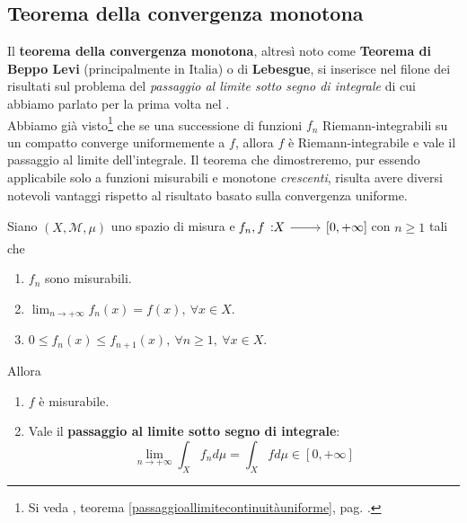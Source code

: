 \subsection{Teorema della convergenza monotona}
Il \textbf{teorema della convergenza monotona}, altresì noto come \textbf{Teorema di Beppo Levi} (principalmente in Italia) o di \textbf{Lebesgue}, si inserisce nel filone dei risultati sul problema del \textit{passaggio al limite sotto segno di integrale} di cui abbiamo parlato per la prima volta nel .\\
Abbiamo già visto\footnote{Si veda , teorema \ref{passaggioallimitecontinuitàuniforme}, pag. \pageref{passaggioallimitecontinuitàuniforme}.} che se una successione di funzioni $f_n$ Riemann-integrabili su un compatto converge uniformemente a $f$, allora $f$ è Riemann-integrabile e vale il passaggio al limite dell'integrale. Il teorema che dimostreremo, pur essendo applicabile solo a funzioni misurabili e monotone \textit{crescenti}, risulta avere diversi notevoli vantaggi rispetto al risultato basato sulla convergenza uniforme.
\begin{theorema}\label{thmconvergenzamonotona}
	Siano $\left(X,\mathcal{M},\mu\right)$ uno spazio di misura e $\funz{f_n,f}{X}{\left[0,+\infty\right]}$ con $n\geq 1$ tali che
	\begin{enumerate}[label=(\alph*)]
		\item $f_n$ sono misurabili.
		\item $\displaystyle\lim_{n\to+\infty}f_n(x)=f(x),\ \forall x\in X$.
		\item $0\leq f_n(x)\leq f_{n+1}(x),\ \forall n\geq 1,\ \forall x\in X$.
	\end{enumerate}
Allora
\begin{enumerate}
	\item $f$ è misurabile.
	\item Vale il \textbf{passaggio al limite sotto segno di integrale}:
	\begin{equation}
		\lim_{n\to+\infty}\int_Xf_nd\mu=\int_Xfd\mu\in\left[0,+\infty\right]
	\end{equation}
\end{enumerate}
\end{theorema}
